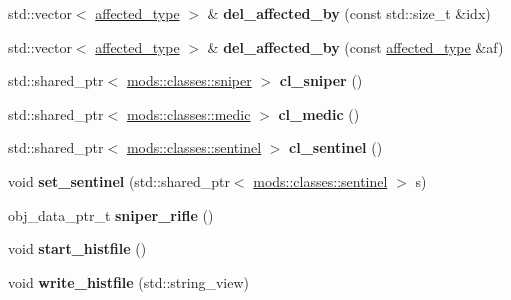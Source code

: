 \begin{DoxyCompactItemize}
\mbox{\label{classmods_1_1player_a15bd12b589620f42a9f6a57b18334142}} 
std\+::vector$<$ \hyperlink{structaffected__type}{affected\+\_\+type} $>$ \& {\bfseries del\+\_\+affected\+\_\+by} (const std\+::size\+\_\+t \&idx)
\item 
\mbox{\label{classmods_1_1player_af3235dd8391fdafec417fddb32f0df2d}} 
std\+::vector$<$ \hyperlink{structaffected__type}{affected\+\_\+type} $>$ \& {\bfseries del\+\_\+affected\+\_\+by} (const \hyperlink{structaffected__type}{affected\+\_\+type} \&af)
\item 
\mbox{\label{classmods_1_1player_aa24993316846c4d1a07ba50cc9f91504}} 
std\+::shared\+\_\+ptr$<$ \hyperlink{structmods_1_1classes_1_1sniper}{mods\+::classes\+::sniper} $>$ {\bfseries cl\+\_\+sniper} ()
\item 
\mbox{\label{classmods_1_1player_aff434718fc2b2d0c16097171d38a2bbc}} 
std\+::shared\+\_\+ptr$<$ \hyperlink{structmods_1_1classes_1_1medic}{mods\+::classes\+::medic} $>$ {\bfseries cl\+\_\+medic} ()
\item 
\mbox{\label{classmods_1_1player_a8877f7dd1e695ce9b0ce29ee776c7136}} 
std\+::shared\+\_\+ptr$<$ \hyperlink{structmods_1_1classes_1_1sentinel}{mods\+::classes\+::sentinel} $>$ {\bfseries cl\+\_\+sentinel} ()
\item 
\mbox{\label{classmods_1_1player_aecd6fc80087322dac1e7475cd85cc37f}} 
void {\bfseries set\+\_\+sentinel} (std\+::shared\+\_\+ptr$<$ \hyperlink{structmods_1_1classes_1_1sentinel}{mods\+::classes\+::sentinel} $>$ s)
\item 
\mbox{\label{classmods_1_1player_abd11111bfe0fc2c61e244e539ef4f27f}} 
obj\+\_\+data\+\_\+ptr\+\_\+t {\bfseries sniper\+\_\+rifle} ()
\item 
\mbox{\label{classmods_1_1player_a976af91450f06af213f9258ca7be0427}} 
void {\bfseries start\+\_\+histfile} ()
\item 
\mbox{\label{classmods_1_1player_ae399e28d13428ef0dc3800bad3e05b5b}} 
void {\bfseries write\+\_\+histfile} (std\+::string\+\_\+view)

\end{DoxyCompactItemize}
